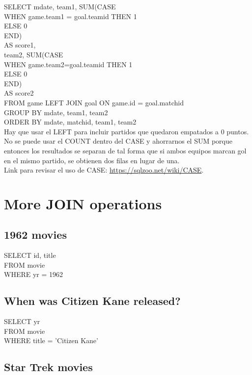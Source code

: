 \documentclass[10pt, oneside]{article}
\begin{document}
SELECT mdate, team1, \color{red}SUM(CASE\\
WHEN game.team1 = goal.teamid THEN 1\\
ELSE 0\\
END)\color{black}\\
AS score1,\\
team2, \color{red}SUM(CASE\\
WHEN game.team2=goal.teamid THEN 1\\
ELSE 0\\
END)\color{black}\\
AS score2\\
FROM game \color{red}LEFT JOIN \color{black}goal ON game.id = goal.matchid\\
GROUP BY mdate, team1, team2\\
ORDER BY mdate, matchid, team1, team2\\

Hay que usar el LEFT para incluir partidos que quedaron empatados a 0 puntos. No se puede usar el COUNT dentro del CASE y ahorrarnos el SUM porque entonces los resultados se separan de tal forma que si ambos equipos marcan gol en el mismo partido, se obtienen dos filas en lugar de una.\\

Link para revisar el uso de CASE: \hyperref{https://sqlzoo.net/wiki/CASE}{}{}{https://sqlzoo.net/wiki/CASE}.

\section{More JOIN operations}

\subsection{1962 movies}

SELECT id, title\\
FROM movie\\
WHERE yr = 1962\\

\subsection{When was Citizen Kane released?}

SELECT yr\\
FROM movie\\
WHERE title = 'Citizen Kane'\\

\subsection{Star Trek movies}
\end{document}
